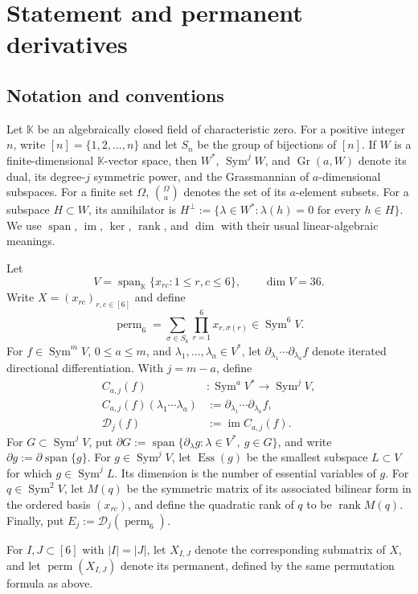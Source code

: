 \documentclass[11pt]{amsart}
\newcommand{\K}{\mathbb{K}}
\newcommand{\Sym}{\operatorname{Sym}}
\newcommand{\Span}{\operatorname{span}}
\newcommand{\im}{\operatorname{im}}
\newcommand{\rank}{\operatorname{rank}}
\newcommand{\perm}{\operatorname{perm}}
\newcommand{\cD}{\mathcal{D}}
\theoremstyle{definition}
\begin{document}
\section{Statement and permanent derivatives}

\subsection*{Notation and conventions}

Let \(\K\) be an algebraically closed field of characteristic zero. For a
positive integer \(n\), write \([n]=\{1,2,\ldots,n\}\) and let \(S_n\) be the
group of bijections of \([n]\). If \(W\) is a finite-dimensional
\(\K\)-vector space, then \(W^*\), \(\Sym^jW\), and \(\operatorname{Gr}(a,W)\)
denote its dual, its degree-\(j\) symmetric power, and the Grassmannian of
\(a\)-dimensional subspaces. For a finite set \(\Omega\),
\(\binom{\Omega}{a}\) denotes the set of its \(a\)-element subsets. For a
subspace \(H\subset W\), its annihilator is
\(H^\perp:=\{\lambda\in W^*: \lambda(h)=0\text{ for every }h\in H\}\).
We use \(\Span\), \(\im\), \(\ker\), \(\rank\), and \(\dim\) with their
usual linear-algebraic meanings.

Let
\[
 V=\Span_{\K}\{x_{rc}:1\le r,c\le6\},\qquad \dim V=36.
\]
Write \(X=(x_{rc})_{r,c\in[6]}\) and define
\[
 \perm_6=\sum_{\sigma\in S_6}\prod_{r=1}^6x_{r,\sigma(r)}\in\Sym^6V.
\]
For \(f\in\Sym^mV\), \(0\le a\le m\), and
\(\lambda_1,\ldots,\lambda_a\in V^*\), let
\(\partial_{\lambda_1}\cdots\partial_{\lambda_a}f\) denote iterated
directional differentiation. With \(j=m-a\), define
\[
 \begin{aligned}
 C_{a,j}(f)&:\Sym^aV^*\longrightarrow\Sym^jV,\\
 C_{a,j}(f)(\lambda_1\cdots\lambda_a)
   &:=\partial_{\lambda_1}\cdots\partial_{\lambda_a}f,\\
 \cD_j(f)&:=\im C_{a,j}(f).
 \end{aligned}
\]
For \(G\subset\Sym^jV\), put
\(\partial G:=\Span\{\partial_\lambda g:\lambda\in V^*,\ g\in G\}\), and
write \(\partial g:=\partial\Span\{g\}\). For \(g\in\Sym^jV\), let \(\operatorname{Ess}(g)\) be the smallest subspace
\(L\subset V\) for which \(g\in\Sym^jL\). Its dimension is the number of
essential variables of \(g\). For \(q\in\Sym^2V\), let \(M(q)\) be the
symmetric matrix of its associated bilinear form in the ordered basis
\((x_{rc})\), and define the quadratic rank of \(q\) to be \(\rank M(q)\).
Finally, put
\(E_j:=\cD_j(\perm_6)\).

For \(I,J\subset[6]\) with \(|I|=|J|\), let \(X_{I,J}\) denote the
corresponding submatrix of \(X\), and let \(\perm(X_{I,J})\) denote its
permanent, defined by the same permutation formula as above.
\end{document}

